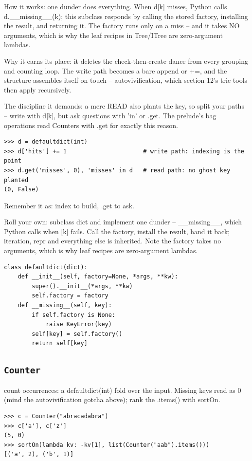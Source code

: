 \documentclass[10pt,letterpaper]{book}
\begin{document}
How it works: one dunder does everything. When d[k] misses, Python calls d.\_\_missing\_\_(k); this subclass responds by calling the stored factory, installing the result, and returning it. The factory runs only on a miss -- and it takes NO arguments, which is why the leaf recipes in Tree/ITree are zero-argument lambdas.


Why it earns its place: it deletes the check-then-create dance from every grouping and counting loop. The write path becomes a bare append or +=, and the structure assembles itself on touch -- autovivification, which section 12's trie tools then apply recursively.


The discipline it demands: a mere READ also plants the key, so split your paths -- write with d[k], but ask questions with 'in' or .get. The prelude's bag operations read Counters with .get for exactly this reason.

\begin{lstlisting}[style=ex]
>>> d = defaultdict(int)
>>> d['hits'] += 1                      # write path: indexing is the point
>>> d.get('misses', 0), 'misses' in d   # read path: no ghost key planted
(0, False)
\end{lstlisting}

Remember it as: index to build, .get to ask.


Roll your own: subclass dict and implement one dunder -- \_\_missing\_\_, which Python calls when [k] fails. Call the factory, install the result, hand it back; iteration, repr and everything else is inherited. Note the factory takes no arguments, which is why leaf recipes are zero-argument lambdas.

\begin{lstlisting}[style=ex]
class defaultdict(dict):
    def __init__(self, factory=None, *args, **kw):
        super().__init__(*args, **kw)
        self.factory = factory
    def __missing__(self, key):
        if self.factory is None:
            raise KeyError(key)
        self[key] = self.factory()
        return self[key]
\end{lstlisting}
\subsection{\texttt{Counter}}\label{def:Counter}
count occurrences: a defaultdict(int) fold over the input. Missing keys read as 0 (mind the autovivification gotcha above); rank the .items() with sortOn.
\begin{lstlisting}[style=ex]
>>> c = Counter("abracadabra")
>>> c['a'], c['z']
(5, 0)
>>> sortOn(lambda kv: -kv[1], list(Counter("aab").items()))
[('a', 2), ('b', 1)]
\end{lstlisting}
\end{document}
